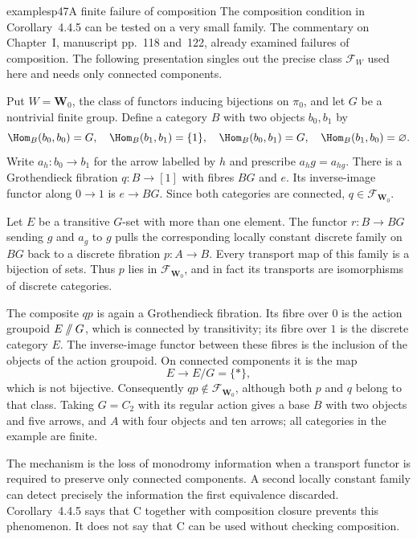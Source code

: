 \begin{dcomment}{examples}{p47}{A finite failure of composition}
The composition condition in Corollary~4.4.5 can be tested on a very small family. The commentary on Chapter~I, manuscript pp.~118 and~122, already examined failures of composition. The following presentation singles out the precise class $\mathcal F_W$ used here and needs only connected components.

Put $W=\mathbf W_0$, the class of functors inducing bijections on $\pi_0$, and let $G$ be a nontrivial finite group. Define a category $B$ with two objects $b_0,b_1$ by
\[
 \Hom_B(b_0,b_0)=G,\quad \Hom_B(b_1,b_1)=\{1\},\quad
 \Hom_B(b_0,b_1)=G,\quad \Hom_B(b_1,b_0)=\varnothing.
\]
Write $a_h:b_0\to b_1$ for the arrow labelled by $h$ and prescribe $a_hg=a_{hg}$. There is a Grothendieck fibration $q:B\to[1]$ with fibres $BG$ and $e$. Its inverse-image functor along $0\to1$ is $e\to BG$. Since both categories are connected, $q\in\mathcal F_{\mathbf W_0}$.

Let $E$ be a transitive $G$-set with more than one element. The functor $r:B\to BG$ sending $g$ and $a_g$ to $g$ pulls the corresponding locally constant discrete family on $BG$ back to a discrete fibration $p:A\to B$. Every transport map of this family is a bijection of sets. Thus $p$ lies in $\mathcal F_{\mathbf W_0}$, and in fact its transports are isomorphisms of discrete categories.

The composite $qp$ is again a Grothendieck fibration. Its fibre over $0$ is the action groupoid $E\mathbin{/\mkern-6mu/}G$, which is connected by transitivity; its fibre over $1$ is the discrete category $E$. The inverse-image functor between these fibres is the inclusion of the objects of the action groupoid. On connected components it is the map
\[
 E\longrightarrow E/G=\{*\},
\]
which is not bijective. Consequently $qp\notin\mathcal F_{\mathbf W_0}$, although both $p$ and $q$ belong to that class. Taking $G=C_2$ with its regular action gives a base $B$ with two objects and five arrows, and $A$ with four objects and ten arrows; all categories in the example are finite.

The mechanism is the loss of monodromy information when a transport functor is required to preserve only connected components. A second locally constant family can detect precisely the information the first equivalence discarded. Corollary~4.4.5 says that C together with composition closure prevents this phenomenon. It does not say that C can be used without checking composition.
\end{dcomment}

